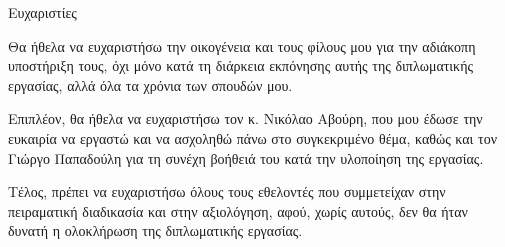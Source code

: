 \begin{center}
{\LARGE Ευχαριστίες}\\[1cm]
\end{center}

\setlength\parindent{24pt}Θα ήθελα να ευχαριστήσω την οικογένεια και τους φίλους μου για την αδιάκοπη υποστήριξη τους, όχι μόνο κατά τη διάρκεια εκπόνησης αυτής της διπλωματικής εργασίας, αλλά όλα τα χρόνια των σπουδών μου.

Επιπλέον, θα ήθελα να ευχαριστήσω τον κ. Νικόλαο Αβούρη, που μου έδωσε την ευκαιρία να εργαστώ και να ασχοληθώ πάνω στο συγκεκριμένο θέμα, καθώς και τον Γιώργο Παπαδούλη  για τη συνέχη βοήθειά του κατά την υλοποίηση της εργασίας.

Τέλος, πρέπει να ευχαριστήσω όλους τους εθελοντές που συμμετείχαν στην πειραματική διαδικασία και στην αξιολόγηση, αφού, χωρίς αυτούς, δεν θα ήταν δυνατή η ολοκλήρωση της διπλωματικής εργασίας.